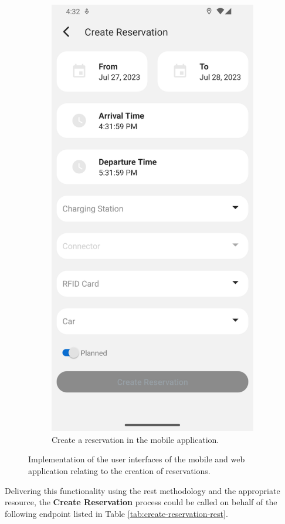 \begin{figure}[h]
\begin{subfigure}[c]{0.3\textwidth}
        \includegraphics[width=\textwidth,height=1.6\textwidth,keepaspectratio]{resources/images/main/6_implementation/screens/create_reservation/mobile/Create_Reservation.png}
        \caption{Create a reservation in the mobile application.}
        \label{fig:mobile-create-reservation-impl}
    \end{subfigure}
    \caption{Implementation of the user interfaces of the mobile and web application relating to the creation of reservations.}
    \label{fig:impl-create-reservation}
\end{figure}

\noindent Delivering this functionality using the \acrshort{rest} methodology and the appropriate resource, the \textbf{Create Reservation} process could be called on behalf of the following endpoint listed in Table \ref{tab:create-reservation-rest}.

